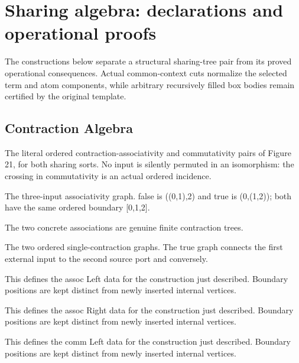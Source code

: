 \clearpage
\section{Sharing algebra: declarations and operational proofs}
\label{sec:sharing-concordance}
The constructions below separate a structural sharing-tree pair from its proved operational consequences. Actual common-context cuts normalize the selected term and atom components, while arbitrary recursively filled box bodies remain certified by the original template.

\subsection{Contraction Algebra}
The literal ordered contraction-associativity and commutativity pairs of Figure 21, for both sharing sorts. No input is silently permuted in an isomorphism: the crossing in commutativity is an actual ordered incidence.

The three-input associativity graph. false is ((0,1),2) and true is (0,(1,2)); both have the same ordered boundary [0,1,2].
\par{}

The two concrete associations are genuine finite contraction trees.
\par{}

The two ordered single-contraction graphs. The true graph connects the first external input to the second source port and conversely.
\par{}

This defines the assoc Left data for the construction just described. Boundary positions are kept distinct from newly inserted internal vertices.
\par{}

This defines the assoc Right data for the construction just described. Boundary positions are kept distinct from newly inserted internal vertices.
\par{}

This defines the comm Left data for the construction just described. Boundary positions are kept distinct from newly inserted internal vertices.
\par{}


